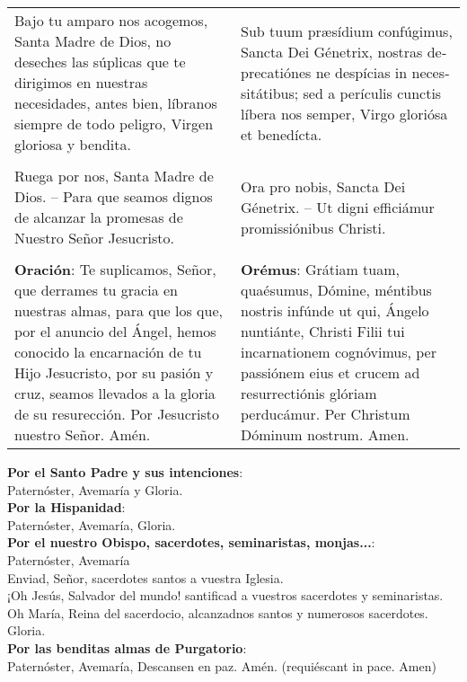 \documentclass[./rosary.tex]{subfiles}
\begin{document}
\begin{longtable} { p{} p{} }
    Bajo tu amparo nos acogemos, Santa Madre de Dios, no deseches las súplicas que te dirigimos en nuestras necesidades, antes bien,
    líbranos siempre de todo peligro, Virgen gloriosa y bendita.
        &
    Sub tuum præsídium confúgimus, Sancta Dei Génetrix, nostras de­pre­ca­tiónes ne despícias in ne­ces­si­tátibus; 
    sed a perículis cunctis líbera nos semper, Virgo gloriósa et benedícta.\\\\
    Ruega por nos, Santa Madre de Dios. -- Para que seamos dignos de alcanzar la promesas de Nuestro Señor Jesucristo.
        &
    Ora pro nobis, Sancta Dei Génetrix. -- Ut digni efficiámur pro­mi­ssiónibus Christi.\\\\

    \textbf{Oración}: Te suplicamos, Señor, que derrames tu gracia en nuestras almas, para que los que, por el anuncio del Ángel, hemos conocido
    la encarnación de tu Hijo Jesucristo, por su pasión y cruz, seamos llevados a la gloria de su resurección. Por Jesucristo nuestro Señor. Amén.
        &
    \textbf{Orémus}: Grátiam tuam, quaésumus, Dómine, méntibus nostris infúnde ut qui, Ángelo nuntiánte, Christi Filii tui incarnationem cognóvimus,
    per passiónem eius et crucem ad resurrectiónis glóriam perducámur. Per Christum Dóminum nostrum. Amen.
\end{longtable}

\noindent\textbf{Por el Santo Padre y sus intenciones}:\\
{\indent}Paternóster, Avemaría y Gloria.\\
\noindent\textbf{Por la Hispanidad}:\\ 
{\indent}Paternóster, Avemaría, Gloria.\\
\noindent\textbf{Por el nuestro Obispo, sacerdotes, seminaristas, monjas...}:\\ 
{\indent}Paternóster, Avemaría\\
{\indent}Enviad, Señor, sacerdotes santos a vuestra Iglesia.\\
{\indent}¡Oh Jesús, Salvador del mundo! santificad a vuestros sacerdotes y seminaristas.\\
{\indent}Oh María, Reina del sacerdocio, alcanzadnos santos y numerosos sacerdotes.\\
{\indent}Gloria.\\
\noindent\textbf{Por las benditas almas de Purgatorio}:\\
{\indent}Paternóster, Avemaría, Descansen en paz. Amén. (requiéscant in pace. Amen)
\end{document}
